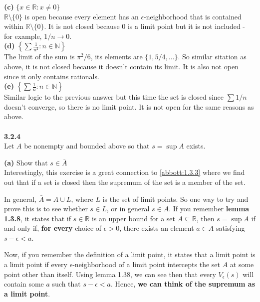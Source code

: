 \textbf{(c)} $\{ x\in\mathbb{R} : x \neq 0 \}$
\\

$\mathbb{R} \setminus \{0\}$ is open because every element has an $\epsilon$-neighborhood that is contained within
$\mathbb{R} \setminus \{0\}$.
It is not closed because 0 is a limit point but it is not included - for example, $1/n \rightarrow 0$.
\\

\textbf{(d)} $\left\{ \sum \frac{1}{n^2} : n\in\mathbb{N} \right\}$
\\

The limit of the sum is $\pi^2 / 6$, its elements are $\{1, 5/4, \ldots \}$.
So similar sitation as above, it is not closed because it doesn't contain its limit.
It is also not open since it only contains rationals.
\\

\textbf{(e)} $\left\{ \sum \frac{1}{n} : n\in\mathbb{N} \right\}$
\\
Similar logic to the previous answer but this time the set is closed since $\sum 1/n$ doesn't converge,
so there is no limit point.
It is not open for the same reasons  as above.
\\~\\



\label{abbott:3.2.4}
\textbf{3.2.4}
\\

Let $A$ be nonempty and bounded above so that $s = \sup A$ exists.

\textbf{(a)} Show that $s\in \bar{A}$
\\

Interestingly, this exercise is a great connection to \ref{abbott:1.3.3} where we find out that if a set is closed
then the supremum of the set is a member of the set.

In general, $\bar{A} = A \cup L$, where $L$ is the set of limit points.
So one way to try and prove this is to see whether $s \in L$, or in general $s \in A$.
If you remember \textbf{lemma 1.3.8},
it states that if $s \in \mathbb{R}$ is an upper bound for a set $A \subseteq \mathbb{R}$,
then $s = \sup A$ if and only if, \textbf{for every} choice of $\epsilon > 0$,
there exists an element $a \in A$ satisfying $s - \epsilon < a$.

Now, if you remember the definition of a limit point, it states that a limit point is a limit point
if every $\epsilon$-neighborhood of a limit point intercepts the set $A$ at some point other than itself.
Using lemma 1.38, we can see then that every $V_\epsilon (s)$ will contain some $a$ such that $s - \epsilon < a$.
Hence, \textbf{we can think of the supremum as a limit point}.
\\

